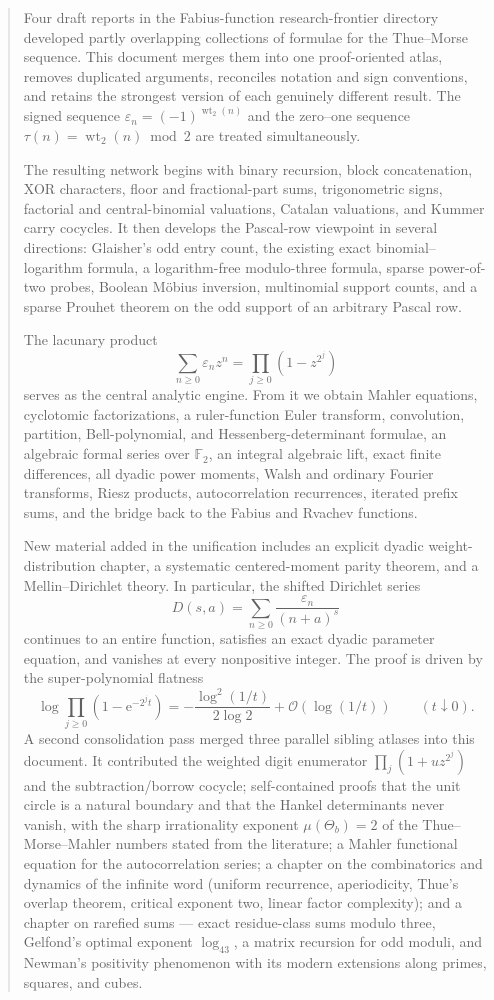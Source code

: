 \documentclass[11pt,oneside]{article}
\numberwithin{equation}{section}
\theoremstyle{definition}
\theoremstyle{remark}
\newcommand{\e}{\mathrm e}
\newcommand{\bigO}{\mathcal O}
\newcommand{\wt}{\operatorname{wt}_2}
\newcommand{\eps}{\varepsilon}
\begin{document}
\begin{abstract}
Four draft reports in the Fabius-function research-frontier directory developed
partly overlapping collections of formulae for the Thue--Morse sequence.  This
document merges them into one proof-oriented atlas, removes duplicated
arguments, reconciles notation and sign conventions, and retains the strongest
version of each genuinely different result.  The signed sequence
\(\eps_n=(-1)^{\wt(n)}\) and the zero--one sequence
\(\tau(n)=\wt(n)\bmod2\) are treated simultaneously.

The resulting network begins with binary recursion, block concatenation, XOR
characters, floor and fractional-part sums, trigonometric signs, factorial and
central-binomial valuations, Catalan valuations, and Kummer carry cocycles.  It
then develops the Pascal-row viewpoint in several directions: Glaisher's odd
entry count, the existing exact binomial--logarithm formula, a logarithm-free
modulo-three formula, sparse power-of-two probes, Boolean M\"obius inversion,
multinomial support counts, and a sparse Prouhet theorem on the odd support of
an arbitrary Pascal row.

The lacunary product
\[
  \sum_{n\ge0}\eps_nz^n=\prod_{j\ge0}(1-z^{2^j})
\]
serves as the central analytic engine.  From it we obtain Mahler equations,
cyclotomic factorizations, a ruler-function Euler transform, convolution,
partition, Bell-polynomial, and Hessenberg-determinant formulae, an algebraic
formal series over \(\mathbb F_2\), an integral algebraic lift, exact finite
differences, all dyadic power moments, Walsh and ordinary Fourier transforms,
Riesz products, autocorrelation recurrences, iterated prefix sums, and the
bridge back to the Fabius and Rvachev functions.

New material added in the unification includes an explicit dyadic
weight-distribution chapter, a systematic centered-moment parity theorem, and a
Mellin--Dirichlet theory.  In particular, the shifted Dirichlet series
\[
  D(s,a)=\sum_{n\ge0}\frac{\eps_n}{(n+a)^s}
\]
continues to an entire function, satisfies an exact dyadic parameter equation,
and vanishes at every nonpositive integer.  The proof is driven by the
super-polynomial flatness
\[
 \log\!\prod_{j\ge0}(1-\e^{-2^jt})
 =-\frac{\log^2(1/t)}{2\log2}+\bigO(\log(1/t))
 \qquad(t\downarrow0).
\]
A second consolidation pass merged three parallel sibling atlases into this
document.  It contributed the weighted digit enumerator
\(\prod_j(1+uz^{2^j})\) and the subtraction/borrow cocycle; self-contained
proofs that the unit circle is a natural boundary and that the Hankel
determinants never vanish, with the sharp irrationality exponent
\(\mu(\Theta_b)=2\) of the Thue--Morse--Mahler numbers stated from the
literature; a Mahler functional equation for the autocorrelation series; a
chapter on the combinatorics and dynamics of the infinite word (uniform
recurrence, aperiodicity, Thue's overlap theorem, critical exponent two,
linear factor complexity); and a chapter on rarefied sums --- exact
residue-class sums modulo three, Gelfond's optimal exponent
\(\log_43\), a matrix recursion for odd moduli, and Newman's positivity
phenomenon with its modern extensions along primes, squares, and cubes.


\end{abstract}
\end{document}
